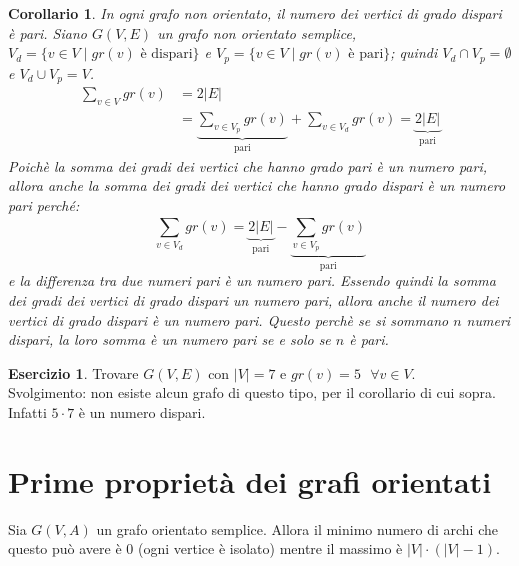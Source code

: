 \documentclass[a4paper, openany]{book}
\theoremstyle{plain}
\newtheorem{cor}[thm]{Corollario}
\theoremstyle{definition}
\newtheorem{eser}{Esercizio}[section]
\begin{document}
\begin{cor}
    In ogni grafo non orientato, il numero dei vertici di grado dispari è pari.
\proof
    Siano $G(V,E)$ un grafo non orientato semplice, ${V_d = \{v \in V \mid gr(v) \text{ è dispari}\}}$ e
    ${V_p = \{v \in V \mid gr(v) \text{ è pari}\}}$; quindi ${V_d \cap V_p = \emptyset}$ e 
    ${V_d \cup V_p = V}$.
    \begin{equation*}
    \begin{split}
        \sum_{v \in V}^{} gr(v) & = 
        2|E| \\ & = 
        \underbrace{{\sum_{v \in V_p}^{} gr(v)}}_{\text{pari}} + {\sum_{v \in V_d}^{} gr(v)} = 
        \underbrace{2|E|}_{\text{pari}}
    \end{split}
    \end{equation*}
    Poichè la somma dei gradi dei vertici che hanno grado pari è un numero pari, 
    allora anche la somma dei gradi dei vertici che hanno grado dispari è un numero pari perché:
    \[
        {\sum_{v \in V_d}^{} gr(v)} = \underbrace{2|E|}_{\text{pari}} - 
                \underbrace{{\sum_{v \in V_p}^{} gr(v)}}_{\text{pari}}
    \]
    e la differenza tra due numeri pari è un numero pari. Essendo quindi la somma dei gradi dei vertici
    di grado dispari un numero pari, allora anche il numero dei vertici di grado dispari è un numero
    pari. Questo perchè se si sommano $n$ numeri dispari, la loro somma è un numero pari 
    se e solo se $n$ è pari.
\endproof
\end{cor}

\begin{eser}
    Trovare $G(V,E)$ con $|V| = 7$ e ${gr(v) = 5 \text{ } \forall v \in V}$.\\
    Svolgimento: non esiste alcun grafo di questo tipo, per il corollario di cui sopra.
    Infatti $5 \cdot 7$ è un numero dispari.%
\end{eser}




\section{Prime proprietà dei grafi orientati}
Sia $G(V,A)$ un grafo orientato semplice. Allora il minimo numero di archi che questo può
avere è $0$ (ogni vertice è isolato) mentre il massimo è ${|V| \cdot (|V|-1)}$.
\end{document}
